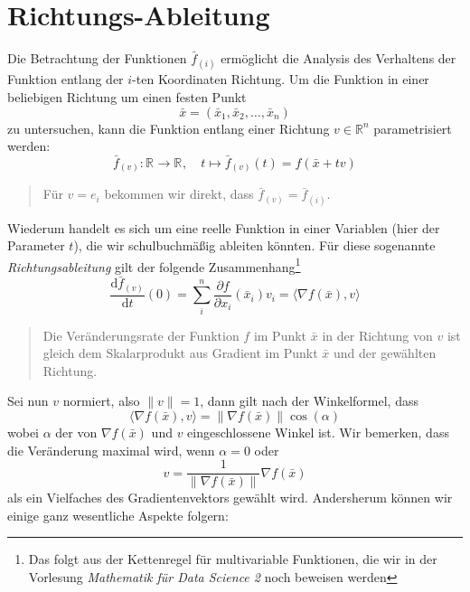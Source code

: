 \documentclass[]{book}
\newenvironment {JHSAYS} [0] {\begin{quote}\color{jhsc}} {\end{quote}}
\theoremstyle{definition}
\theoremstyle{definition}
\theoremstyle{definition}
\theoremstyle{definition}
\theoremstyle{remark}
\begin{document}
\hypertarget{richtungs-ableitung}{%
\section{Richtungs-Ableitung}\label{richtungs-ableitung}}

Die Betrachtung der Funktionen \(\bar f_{(i)}\) ermöglicht die Analysis des Verhaltens der Funktion entlang der \(i\)-ten Koordinaten Richtung. Um die Funktion in einer beliebigen Richtung um einen festen Punkt
\begin{equation*}
\bar x = (\bar x_1, \bar x_2, \dotsc, \bar x_n)
\end{equation*}
zu untersuchen, kann die Funktion entlang einer Richtung \(v \in \mathbb R^{n}\) parametrisiert werden:
\begin{equation*}
\bar f_{(v)} \colon \mathbb R^{} \to \mathbb R^{}, \quad t \mapsto \bar f_{(v)}(t) = f(\bar x + tv)
\end{equation*}

\leavevmode\hypertarget{richtung-is-partiell}{}%
\begin{JHSAYS}
Für \(v=e_i\) bekommen wir direkt, dass \(\bar f_{(v)}=\bar f_{(i)}\).

\end{JHSAYS}

Wiederum handelt es sich um eine reelle Funktion in einer Variablen (hier der Parameter \(t\)), die wir schulbuchmäßig ableiten könnten. Für diese sogenannte \emph{Richtungsableitung} gilt der folgende Zusammenhang\footnote{Das folgt aus der Kettenregel für multivariable Funktionen, die wir in der Vorlesung \emph{Mathematik für Data Science 2} noch beweisen werden}
\begin{equation*}
\frac{\mathrm{d} \bar f_{(v)}}{\mathrm{d} t}(0) = \sum_i^n \frac{\partial f}{\partial x_i}(\bar x_i) v_i = \langle \nabla f(\bar x), v \rangle
\end{equation*}

\leavevmode\hypertarget{richtung-ableitung}{}%
\begin{JHSAYS}
Die Veränderungsrate der Funktion \(f\) im Punkt \(\bar x\) in der Richtung von \(v\) ist gleich dem Skalarprodukt aus Gradient im Punkt \(\bar x\) und der gewählten Richtung.

\end{JHSAYS}

Sei nun \(v\) normiert, also \(\|v\|=1\), dann gilt nach der Winkelformel, dass
\begin{equation*}
\langle \nabla f(\bar x), v \rangle = \|\nabla f(\bar x) \| \cos (\alpha)
\end{equation*}
wobei \(\alpha\) der von \(\nabla f(\bar x)\) und \(v\) eingeschlossene Winkel ist. Wir bemerken, dass die Veränderung maximal wird, wenn \(\alpha = 0\) oder
\begin{equation*}
v = \frac{1}{ \| \nabla f(\bar x) \| } \nabla f(\bar x)
\end{equation*}
als ein Vielfaches des Gradientenvektors gewählt wird.
Andersherum können wir einige ganz wesentliche Aspekte folgern:
\end{document}
